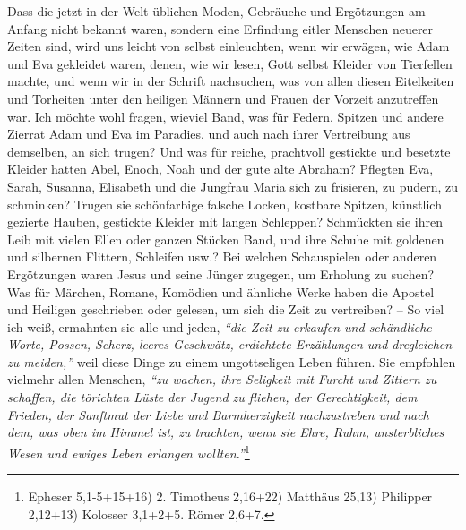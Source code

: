 Dass die jetzt in der Welt üblichen Moden, Gebräuche und Ergötzungen am Anfang
nicht bekannt waren, sondern eine Erfindung eitler Menschen neuerer Zeiten sind,
wird uns leicht von selbst einleuchten, wenn wir erwägen, wie
Adam und Eva
gekleidet waren, denen, wie wir lesen, Gott selbst Kleider von Tierfellen
machte, und wenn wir in der Schrift nachsuchen, was von allen diesen Eitelkeiten
und Torheiten unter den heiligen Männern und
Frauen der Vorzeit anzutreffen
war. Ich möchte wohl fragen, wieviel Band, was für Federn, Spitzen und andere
Zierrat Adam und Eva im Paradies, und auch nach ihrer Vertreibung aus
demselben, an sich trugen? Und was für reiche, prachtvoll gestickte und besetzte
Kleider hatten Abel, Enoch,
Noah und der gute alte Abraham?
Pflegten Eva, Sarah,
Susanna, Elisabeth und die
Jungfrau Maria sich zu frisieren, zu pudern, zu
schminken? Trugen sie schönfarbige falsche Locken, kostbare Spitzen, künstlich
gezierte Hauben, gestickte Kleider mit langen
Schleppen? Schmückten sie ihren
Leib mit vielen Ellen oder ganzen Stücken Band, und ihre Schuhe mit goldenen und
silbernen Flittern, Schleifen usw.? Bei welchen Schauspielen oder anderen
Ergötzungen waren Jesus und seine Jünger zugegen, um Erholung zu suchen? Was für
Märchen, Romane, Komödien und
ähnliche Werke haben die Apostel und Heiligen
geschrieben oder gelesen, um sich die Zeit zu vertreiben? -- So viel ich weiß,
ermahnten sie alle und jeden,
\textit{"`die Zeit zu erkaufen und schändliche Worte,
Possen, Scherz, leeres Geschwätz, erdichtete Erzählungen und dregleichen zu
meiden,"'}
weil diese Dinge zu einem ungottseligen Leben führen. Sie empfohlen vielmehr
allen Menschen,
\textit{"`zu wachen, ihre Seligkeit mit Furcht und Zittern zu schaffen,
die törichten Lüste der Jugend zu fliehen, der Gerechtigkeit, dem Frieden, der
Sanftmut der Liebe und Barmherzigkeit nachzustreben und nach dem, was oben
im Himmel ist, zu trachten, wenn sie Ehre, Ruhm, unsterbliches Wesen und ewiges
Leben erlangen wollten."'}\footnote{Epheser 5,1-5+15+16)
2. Timotheus 2,16+22)
Matthäus 25,13)
Philipper 2,12+13)
Kolosser 3,1+2+5.
Römer 2,6+7.}

